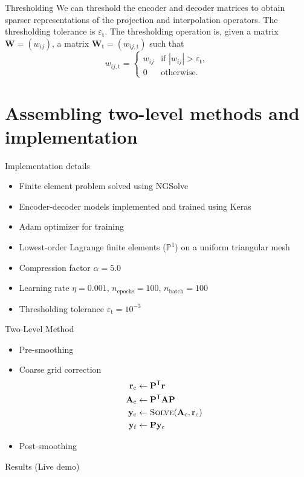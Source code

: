 \documentclass{beamer}
\newcommand{\A}{\mathbf{A}}
\newcommand{\Ac}{\mathbf{A}_\mathrm{c}}
\newcommand{\W}{\mathbf{W}}
\newcommand{\V}{\mathbf{V}}
\newcommand{\PP}{\mathbf{P}}
\newcommand{\yyc}{\mathbf{y}_\mathrm{c}}
\newcommand{\yyf}{\mathbf{y}_\mathrm{f}}
\newcommand{\rr}{\mathbf{r}}
\newcommand{\rrc}{\mathbf{r}_\mathrm{c}}
\newcommand{\R}{\mathcal{R}}
\newcommand{\tol}[1]{\varepsilon_{#1}}
\newcommand{\learningrate}{\eta}
\newcommand{\compressionfactor}{\alpha}
\begin{document}
\begin{frame}{Thresholding}
    We can threshold the encoder and decoder matrices to obtain sparser representations of the projection and interpolation operators.
    The thresholding tolerance is \(\tol{\mathrm{t}}\).
    The thresholding operation is, given a matrix \(\W = (w_{ij})\), a matrix \(\W_{\mathrm{t}} = (w_{ij, \mathrm{t}})\) such that
    \begin{equation*}
        w_{ij, \mathrm{t}} = \begin{cases}
            w_{ij} & \text{if } |w_{ij}| > \tol{\mathrm{t}}, \\
            0 & \text{otherwise}.
        \end{cases}
    \end{equation*}
\end{frame}


\section{Assembling two-level methods and implementation}
\begin{frame}{Implementation details}
\begin{itemize}
   \item Finite element problem solved using NGSolve
   \item Encoder-decoder models implemented and trained using Keras
   \item Adam optimizer for training
   \item Lowest-order Lagrange finite elements (\(\mathbb{P}^1\)) on a uniform triangular mesh
   \item Compression factor $\compressionfactor = 5.0$
   \item Learning rate $\learningrate = 0.001$, $n_\mathrm{epochs} = 100$, $n_\mathrm{batch} = 100$
   \item Thresholding tolerance $\tol{\mathrm{t}} = 10^{-3}$
\end{itemize}
\end{frame}

\begin{frame}{Two-Level Method}
\begin{itemize}
   \item Pre-smoothing
   \item Coarse grid correction
   \begin{align*}
       \rrc &\gets \PP^\mathsf{T} \rr \\
       \Ac &\gets \PP^\mathsf{T} \A \PP \\
       \yyc &\gets \textsc{Solve}( \Ac, \rrc) \\
       \yyf &\gets \PP \yyc
   \end{align*}
   \item Post-smoothing
\end{itemize}
\end{frame}

\begin{frame}{Results}
    (Live demo)
\end{frame}
\end{document}
